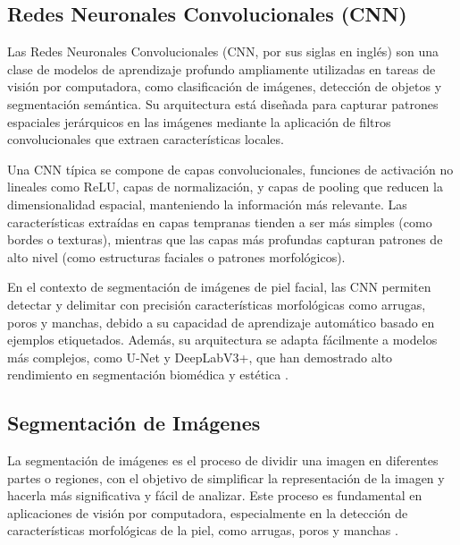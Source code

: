 \subsection{Redes Neuronales Convolucionales (CNN)}


Las Redes Neuronales Convolucionales (CNN, por sus siglas en inglés) son una clase de modelos de aprendizaje profundo ampliamente utilizadas en tareas de visión por computadora, como clasificación de imágenes, detección de objetos y segmentación semántica. Su arquitectura está diseñada para capturar patrones espaciales jerárquicos en las imágenes mediante la aplicación de filtros convolucionales que extraen características locales.

Una CNN típica se compone de capas convolucionales, funciones de activación no lineales como ReLU, capas de normalización, y capas de pooling que reducen la dimensionalidad espacial, manteniendo la información más relevante. Las características extraídas en capas tempranas tienden a ser más simples (como bordes o texturas), mientras que las capas más profundas capturan patrones de alto nivel (como estructuras faciales o patrones morfológicos).

En el contexto de segmentación de imágenes de piel facial, las CNN permiten detectar y delimitar con precisión características morfológicas como arrugas, poros y manchas, debido a su capacidad de aprendizaje automático basado en ejemplos etiquetados. Además, su arquitectura se adapta fácilmente a modelos más complejos, como U-Net y DeepLabV3+, que han demostrado alto rendimiento en segmentación biomédica y estética \cite{lecun1998gradient, krizhevsky2012imagenet, ronneberger2015unet}.



\subsection{Segmentación de Imágenes}
La segmentación de imágenes es el proceso de dividir una imagen en diferentes partes o regiones, con el objetivo de simplificar la representación de la imagen y hacerla más significativa y fácil de analizar. Este proceso es fundamental en aplicaciones de visión por computadora, especialmente en la detección de características morfológicas de la piel, como arrugas, poros y manchas \parencite{autor2020segmentacion}.

